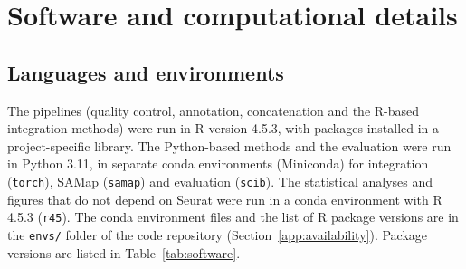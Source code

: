 \chapter{Software and computational details} \label{app:software}

\section{Languages and environments}

The pipelines (quality control, annotation, concatenation and the R-based integration methods) were run in R version 4.5.3, with packages installed in a project-specific library.
%
The Python-based methods and the evaluation were run in Python 3.11, in separate conda environments (Miniconda) for integration (\texttt{torch}), SAMap (\texttt{samap}) and evaluation (\texttt{scib}).
%
The statistical analyses and figures that do not depend on Seurat were run in a conda environment with R 4.5.3 (\texttt{r45}).
%
The conda environment files and the list of R package versions are in the \texttt{envs/} folder of the code repository (Section~\ref{app:availability}).
%
Package versions are listed in Table~\ref{tab:software}.

